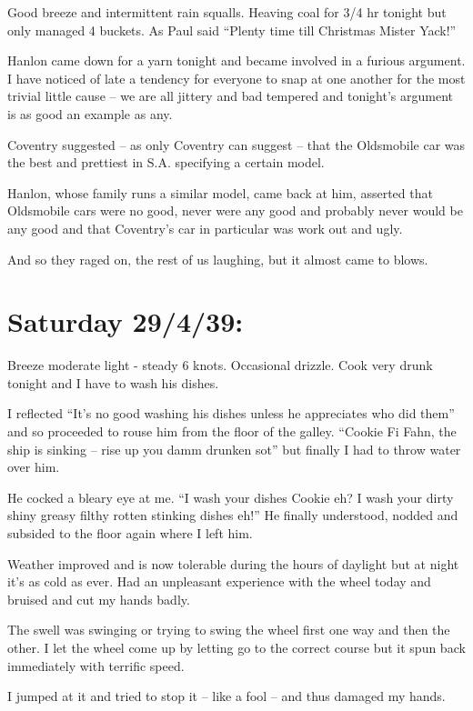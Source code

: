 \documentclass[
  11pt,
  msmallroyalvopaper
]{memoir}
\begin{document}
Good breeze and intermittent rain squalls. Heaving coal for 3/4 hr
tonight but only managed 4 buckets. As Paul said ``Plenty time till
Christmas Mister Yack!''

Hanlon came down for a yarn tonight and became involved in a furious
argument. I have noticed of late a tendency for everyone to snap at one
another for the most trivial little cause -- we are all jittery and bad
tempered and tonight's argument is as good an example as any.

Coventry suggested -- as only Coventry can suggest -- that the
Oldsmobile car was the best and prettiest in S.A. specifying a certain
model.

Hanlon, whose family runs a similar model, came back at him, asserted
that Oldsmobile cars were no good, never were any good and probably
never would be any good and that Coventry's car in particular was work
out and ugly.

And so they raged on, the rest of us laughing, but it almost came to
blows.

\hypertarget{saturday-29439}{%
\section{Saturday 29/4/39:}\label{saturday-29439}}

Breeze moderate light - steady 6 knots. Occasional drizzle. Cook very
drunk tonight and I have to wash his dishes.

I reflected ``It's no good washing his dishes unless he appreciates who
did them'' and so proceeded to rouse him from the floor of the galley.
``Cookie Fi Fahn, the ship is sinking -- rise up you damm drunken sot''
but finally I had to throw water over him.

He cocked a bleary eye at me. ``I wash your dishes Cookie eh? I wash
your dirty shiny greasy filthy rotten stinking dishes eh!'' He finally
understood, nodded and subsided to the floor again where I left him.

Weather improved and is now tolerable during the hours of daylight but
at night it's as cold as ever. Had an unpleasant experience with the
wheel today and bruised and cut my hands badly.

The swell was swinging or trying to swing the wheel first one way and
then the other. I let the wheel come up by letting go to the correct
course but it spun back immediately with terrific speed.

I jumped at it and tried to stop it -- like a fool -- and thus damaged
my hands.
\end{document}
